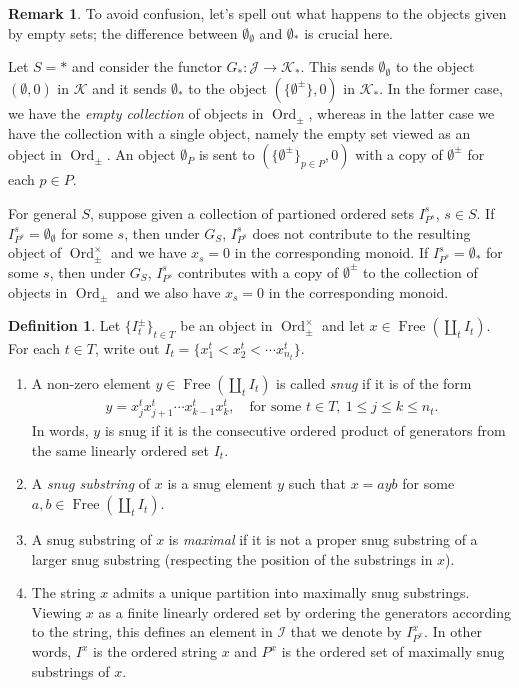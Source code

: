 \documentclass[12pt, reqno]{amsart}
\theoremstyle{plain}
\theoremstyle{definition}
\newtheorem{definition}[theorem]{Definition}
\newtheorem{remark}[theorem]{Remark}
\begin{document}
\begin{remark}
To avoid confusion, let's spell out what happens to the objects given by empty sets; the difference between $\emptyset_\emptyset$ and $\emptyset_\ast$ is crucial here.

Let $S=\ast$ and consider the functor $G_\ast\colon \mathcal{J}\rightarrow \mathcal{K}_\ast$. This sends $\emptyset_\emptyset$ to the object $(\emptyset, 0)$ in $\mathcal{K}$ and it sends $\emptyset_\ast$ to the object $(\{\emptyset^\pm\},0)$ in $\mathcal{K}_\ast$. In the former case, we have the \textit{empty collection} of objects in $\operatorname{Ord}_\pm$, whereas in the latter case we have the collection with a single object, namely the empty set viewed as an object in $\operatorname{Ord}_\pm$. An object $\emptyset_P$ is sent to $(\{\emptyset^\pm\}_{p\in P},0)$ with a copy of $\emptyset^\pm$ for each $p\in P$.

For general $S$, suppose given a collection of partioned ordered sets $I^s_{P^s}$, $s\in S$. If $I^s_{P^s}=\emptyset_\emptyset$ for some $s$, then under $G_S$, $I^s_{P^s}$ does not contribute to the resulting object of $\operatorname{Ord}_\pm^\times$ and we have $x_s=0$ in the corresponding monoid. If $I^s_{P^s}=\emptyset_\ast$ for some $s$, then under $G_S$, $I^s_{P^s}$ contributes with a copy of $\emptyset^\pm$ to the collection of objects in $\operatorname{Ord}_\pm$ and we also have $x_s=0$ in the corresponding monoid.
\end{remark}

\begin{definition}\label{partition into maximally snug substrings}
Let $\{I_t^\pm\}_{t\in T}$ be an object in $\operatorname{Ord}_\pm^\times$ and let $x\in \operatorname{Free}(\coprod_t I_t)$. For each $t\in T$, write out $I_t=\{x_1^t<x_2^t<\cdots x_{n_t}^t\}$.
\begin{enumerate}
\item A non-zero element $y\in \operatorname{Free}(\coprod_t I_t)$ is called \textit{snug} if it is of the form 
\begin{align*}
y=x_j^tx_{j+1}^t \cdots x_{k-1}^t x_k^t,\quad \text{for some }t\in T, \ 1\leq j\leq k\leq n_t.
\end{align*}
In words, $y$ is snug if it is the consecutive ordered product of generators from the same linearly ordered set $I_t$.
\item A \textit{snug substring} of $x$ is a snug element $y$ such that $x=ayb$ for some $a,b\in \operatorname{Free}(\coprod_t I_t)$.
\item A snug substring of $x$ is \textit{maximal} if it is not a proper snug substring of a larger snug substring (respecting the position of the substrings in $x$).
\item The string $x$ admits a unique partition into maximally snug substrings. Viewing $x$ as a finite linearly ordered set by ordering the generators according to the string, this defines an element in $\mathcal{I}$ that we denote by $I^x_{P^x}$. In other words, $I^x$ is the ordered string $x$ and $P^x$ is the ordered set of maximally snug substrings of $x$.\qedhere
\end{enumerate}
\end{definition}
\end{document}
